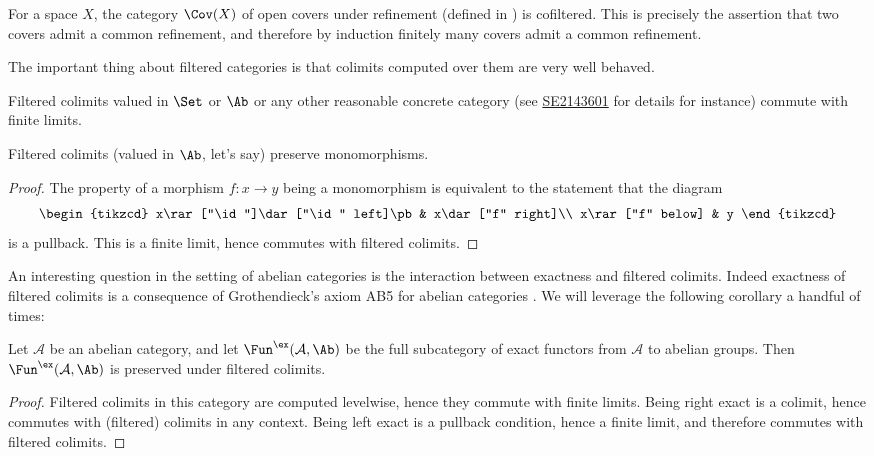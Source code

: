 \documentclass[11pt]{book}
\begin{document}
\begin{example}\label{exa:CovX-filtered} For a space $X$, the category $\Cov(X)$ of open covers under refinement (defined in ) is cofiltered. This is precisely the assertion that two covers admit a common refinement, and therefore by induction finitely many covers admit a common refinement.
\end{example}

The important thing about filtered categories is that colimits computed over them are very well behaved.

\begin{proposition} Filtered colimits valued in $\Set$ or $\Ab$ or any other reasonable concrete category (see \href{https://math.stackexchange.com/a/2143601}{SE2143601} for details for instance) commute with finite limits.
\end{proposition}

\begin{corollary} Filtered colimits (valued in $\Ab$, let's say) preserve monomorphisms.
\end{corollary}
\begin{proof} The property of a morphism $f \colon x \to y$ being a monomorphism is equivalent to the statement that the diagram
\[ \begin{tikzcd}
    x\rar["\id"]\dar["\id" left]\pb & x\dar["f" right]\\
    x\rar["f" below] & y
\end{tikzcd} \]
is a pullback. This is a finite limit, hence commutes with filtered colimits.
\end{proof}

An interesting question in the setting of abelian categories is the interaction between exactness and filtered colimits. Indeed exactness of filtered colimits is a consequence of Grothendieck's axiom AB5 for abelian categories \cite[1.8.1]{Tohoku}. We will leverage the following corollary a handful of times:

\begin{corollary}\label{cor:filtered-colimits-preserve-exactness} 
Let $\mathcal{A}$ be an abelian category, and let $\Fun^\ex(\mathcal{A},\Ab)$ be the full subcategory of exact functors from $\mathcal{A}$ to abelian groups. Then $\Fun^\ex(\mathcal{A},\Ab)$ is preserved under filtered colimits.
\end{corollary}
\begin{proof} Filtered colimits in this category are computed levelwise, hence they commute with finite limits. Being right exact is a colimit, hence commutes with (filtered) colimits in any context. Being left exact is a pullback condition, hence a finite limit, and therefore commutes with filtered colimits.
\end{proof}
\end{document}
